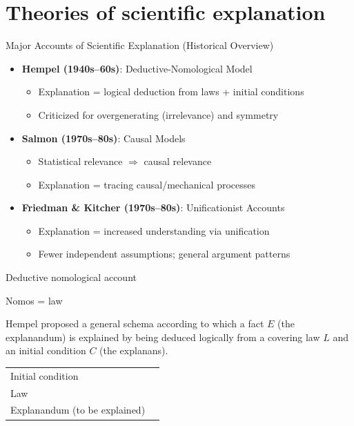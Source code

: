 \documentclass[fleqn]{beamer}
\begin{document}
\section{Theories of scientific explanation}

\begin{frame}{Major Accounts of Scientific Explanation (Historical Overview)}

\scriptsize
\begin{itemize}
  \item \textbf{Hempel (1940s–60s)}: Deductive-Nomological Model
    \begin{itemize}
      \item Explanation = logical deduction from laws + initial conditions
      \item Criticized for overgenerating (irrelevance) and symmetry
    \end{itemize}

  \item \textbf{Salmon (1970s–80s)}: Causal Models
    \begin{itemize}
      \item Statistical relevance $\Rightarrow$ causal relevance
      \item Explanation = tracing causal/mechanical processes
    \end{itemize}

  \item \textbf{Friedman \& Kitcher (1970s–80s)}: Unificationist Accounts
    \begin{itemize}
      \item Explanation = increased understanding via unification
      \item Fewer independent assumptions; general argument patterns
    \end{itemize}
\end{itemize}

\end{frame}




\begin{frame}{Deductive nomological account}

  Nomos = law

  \medskip Hempel proposed a general schema according to which a fact
  $E$ (the explanandum) is explained by being deduced logically from a
  covering law $L$ and an initial condition $C$ (the explanans).

  \vfill \begin{tabular}{ll}
  Initial condition \\
  Law \\ \hline
  Explanandum (to be explained)
  \end{tabular}

\end{frame}
\end{document}

